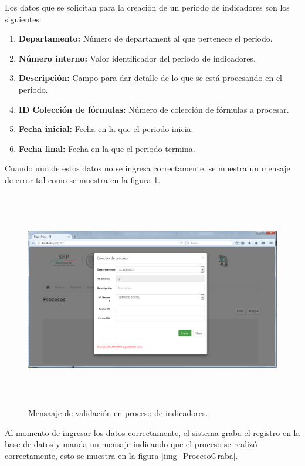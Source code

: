 			Los datos que se solicitan para la creaci\'on de un periodo de indicadores son los siguientes:
			\begin{enumerate}[1.]
				\item \textbf{Departamento:} N\'umero de departament al que pertenece el periodo.
				\item \textbf{N\'umero interno:} Valor identificador del periodo de indicadores.
				\item \textbf{Descripci\'on:} Campo para dar detalle de lo que se est\'a procesando en el periodo.
				\item \textbf{ID Colecci\'on de f\'ormulas:} N\'umero de colecci\'on de f\'ormulas a procesar.
				\item \textbf{Fecha inicial:} Fecha en la que el periodo inicia.
				\item \textbf{Fecha final:} Fecha en la que el periodo termina.
			\end{enumerate}

			Cuando uno de estos datos no se ingresa correctamente, se muestra un mensaje de error tal como se muestra en la figura \ref{fig_ProcesoValida}.\\

			\begin{figure}[]
		        \centering
		        \includegraphics[width=16cm, height=9.5cm]{figuras/ProcesoValida}
		        \caption{Mensaaje de validaci\'on en proceso de indicadores.}
		        \label{fig_ProcesoValida}
		    \end{figure}

		    Al momento de ingresar los datos correctamente, el sistema graba el registro en la base de datos y manda un mensaje indicando que el proceso se realiz\'o correctamente, esto se muestra en la figura \ref{img_ProcesoGraba}.\\

